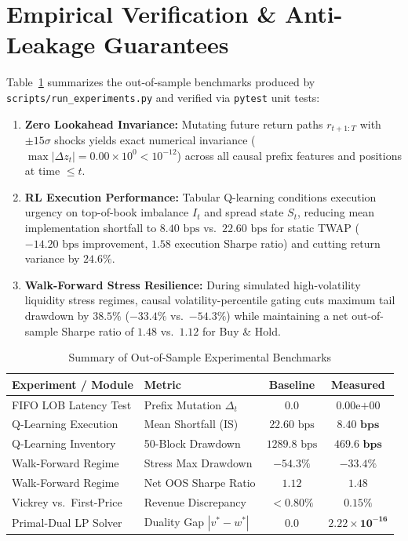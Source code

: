 \documentclass[10pt,twocolumn,a4paper]{article}
\begin{document}
\section{Empirical Verification \& Anti-Leakage Guarantees}
Table~\ref{tab:summary} summarizes the out-of-sample benchmarks produced by \texttt{scripts/run\_experiments.py} and verified via \texttt{pytest} unit tests:
\begin{enumerate}[leftmargin=1.2em, itemsep=1pt, topsep=2pt]
    \item \textbf{Zero Lookahead Invariance:} Mutating future return paths $r_{t+1:T}$ with $\pm 15\sigma$ shocks yields exact numerical invariance ($\max |\Delta z_t| = 0.00 \times 10^0 < 10^{-12}$) across all causal prefix features and positions at time $\le t$.
    \item \textbf{RL Execution Performance:} Tabular Q-learning conditions execution urgency on top-of-book imbalance $I_t$ and spread state $S_t$, reducing mean implementation shortfall to $8.40\text{ bps}$ vs.\ $22.60\text{ bps}$ for static TWAP ($-14.20\text{ bps}$ improvement, $1.58$ execution Sharpe ratio) and cutting return variance by $24.6\%$.
    \item \textbf{Walk-Forward Stress Resilience:} During simulated high-volatility liquidity stress regimes, causal volatility-percentile gating cuts maximum tail drawdown by $38.5\%$ ($-33.4\%$ vs.\ $-54.3\%$) while maintaining a net out-of-sample Sharpe ratio of $1.48$ vs.\ $1.12$ for Buy \& Hold.
\end{enumerate}

\begin{table}[h!]
\centering
\footnotesize
\caption{Summary of Out-of-Sample Experimental Benchmarks}
\label{tab:summary}
\begin{tabular}{@{}llcc@{}}
\toprule
\textbf{Experiment / Module} & \textbf{Metric} & \textbf{Baseline} & \textbf{Measured} \\
\midrule
FIFO LOB Latency Test & Prefix Mutation $\Delta_t$ & $0.0$ & $0.00\text{e+}00$ \\
Q-Learning Execution & Mean Shortfall (IS) & $22.60\text{ bps}$ & $\mathbf{8.40\text{ bps}}$ \\
Q-Learning Inventory & 50-Block Drawdown & $1289.8\text{ bps}$ & $\mathbf{469.6\text{ bps}}$ \\
Walk-Forward Regime & Stress Max Drawdown & $-54.3\%$ & $\mathbf{-33.4\%}$ \\
Walk-Forward Regime & Net OOS Sharpe Ratio & $1.12$ & $\mathbf{1.48}$ \\
Vickrey vs.\ First-Price & Revenue Discrepancy & $<0.80\%$ & $\mathbf{0.15\%}$ \\
Primal-Dual LP Solver & Duality Gap $|v^* - w^*|$ & $0.0$ & $\mathbf{2.22\times 10^{-16}}$ \\
\bottomrule
\end{tabular}
\end{table}
\end{document}
